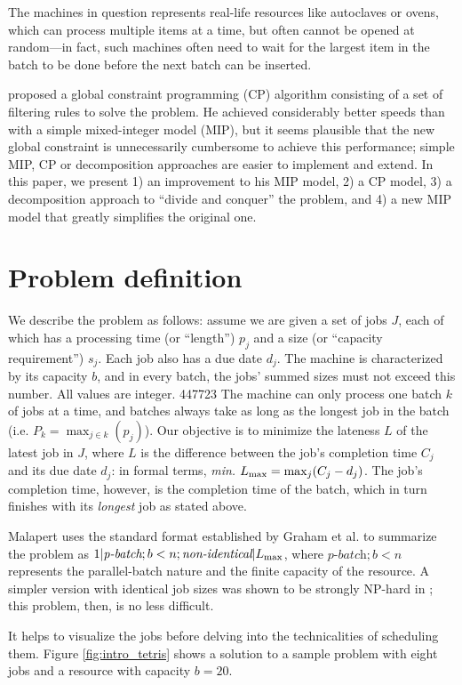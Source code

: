 \documentclass[13pt, letterpaper, oneside]{book}
\begin{document}
The machines in question represents real-life resources like autoclaves or
ovens, which can process multiple items at a time, but often cannot be opened at
random---in fact, such machines often need to wait for the largest item in the
batch to be done before the next batch can be inserted.

\citet{Malapert} proposed a global constraint programming (CP) algorithm consisting
of a set of filtering rules to solve the problem. He achieved considerably
better speeds than with a simple mixed-integer model (MIP), but it seems plausible
that the new global constraint is unnecessarily cumbersome to achieve this
performance; simple MIP, CP or decomposition approaches are easier to implement
and extend.  In this paper, we present 1) an improvement to his MIP model, 2) a
CP model, 3) a decomposition approach to ``divide and conquer'' the problem, and
4) a new MIP model that greatly simplifies the original one.

\section{Problem definition}
We describe the problem as follows: assume we are given a set of jobs $J$, each of
which has a processing time (or ``length'') $p_j$ and a size (or ``capacity
requirement'') $s_j$. Each job also
has a due date $d_j$. The machine is characterized by its capacity $b$, and in
every batch, the jobs' summed sizes must not exceed this number. All values are
integer.
447723
The machine can only process one batch $k$ of jobs at a time, and batches always
take as long as the longest job in the batch (i.e. $P_k = \max_{j \in k}(p_j)$).
Our objective is to minimize the lateness $L$ of the latest job in $J$, where
$L$ is the difference between the job's completion time $C_j$ and its due date
$d_j$: in formal terms, \textit{min.} $L_{\text{max}} = \max_j(C_j - d_j)$. The job's
completion time, however, is the completion time of the batch, which in turn
finishes with its \textit{longest} job as stated above.

Malapert uses the standard format established by Graham et al. to
summarize the problem as $1|\textit{p-batch}; b < n;
\textit{non-identical}|L_{\text{max}}$, where $\textit{p-batch};b<n$ represents the
parallel-batch nature and the finite capacity of the resource. A simpler version
with identical job sizes was shown to be strongly NP-hard in \citep{Brucker};
this problem, then, is no less difficult.

It helps to visualize the jobs before delving into the technicalities of
scheduling them. Figure \ref{fig:intro_tetris} shows a solution to a sample
problem with eight jobs and a resource with capacity $b = 20$.
\end{document}
